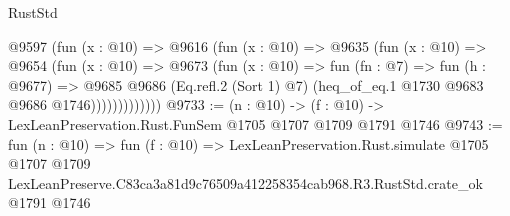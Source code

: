 \begin{lexlean}{RustStd}
\begin{coremodule}
                @9597
                  (fun (x : @10) =>
                  @9616
                    (fun (x : @10) =>
                    @9635
                      (fun (x : @10) =>
                      @9654
                        (fun (x : @10) =>
                        @9673
                          (fun (x : @10) =>
                          fun (fn : @7) =>
                          fun (h : @9677) =>
                          @9685
                            @9686
                            (Eq.refl.{2} (Sort 1) @7)
                            (heq_of_eq.{1} @1730 @9683 @9686 @1746)))))))))))))
@9733 := (n : @10) -> (f : @10) -> LexLeanPreservation.Rust.FunSem @1705 @1707 @1709 @1791 @1746
@9743 := fun (n : @10) =>
  fun (f : @10) =>
  LexLeanPreservation.Rust.simulate
    @1705
    @1707
    @1709
    LexLeanPreserve.C83ca3a81d9c76509a412258354cab968.R3.RustStd.crate_ok
    @1791
    @1746
\end{coremodule}
\end{lexlean}
